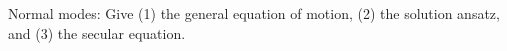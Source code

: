 

\vspace*{\fill}
\centering

Normal modes: Give (1) the general equation of motion, (2) the solution ansatz, and (3) the secular equation.

\centering
\vspace*{\fill}

